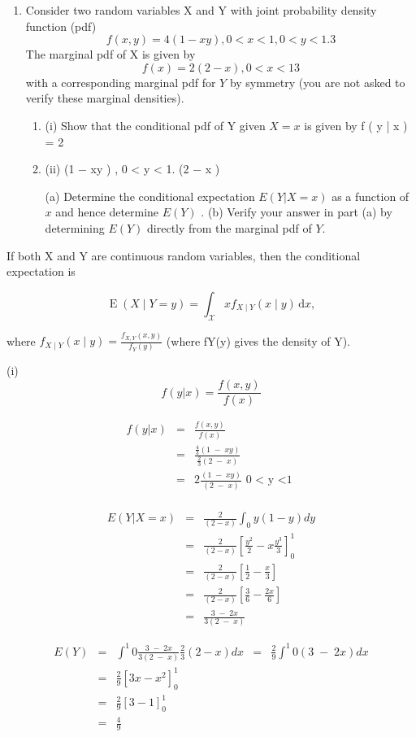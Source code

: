 \documentclass[a4paper,12pt]{article}
\begin{document}
\begin{enumerate}
\item %
Consider two random variables X and Y with joint probability density function (pdf)
\[f ( x , y ) =
4
(1 − xy ) , 0 < x < 1, 0 < y < 1 .
3\]
The marginal pdf of X is given by
\[f ( x ) =
2
(2 − x ) , 0 < x < 1
3\]
with a corresponding marginal pdf for $Y$ by symmetry (you are not asked to verify these marginal densities).
\begin{enumerate}
    \item (i)
Show that the conditional pdf of Y given $X = x$ is given by
f ( y | x ) = 2
\item (ii)
(1 − xy )
, 0 < y < 1.
(2 − x )

(a) Determine the conditional expectation $E ( Y | X = x )$ as a function of $x$ and hence determine $E ( Y )$ .
(b) Verify your answer in part (a) by determining $E ( Y )$ directly from the marginal pdf of $Y$.
\end{enumerate}
\end{enumerate}

\newpage
\begin{framed}
If both X and Y are continuous random variables, then the conditional expectation is

\[{\displaystyle \operatorname {E} (X\mid Y=y)=\int _{\mathcal {X}}xf_{X\mid Y}(x\mid y)\,\mathrm {d} x,} \]

where $ {\displaystyle f_{X\mid Y}(x\mid y)={\frac {f_{X,Y}(x,y)}{f_{Y}(y)}}}$ 
(where fY(y) gives the density of Y). 
\end{framed}
(i)
\[ f(y|x) = \frac{f(x,y)}{f(x)}\]

\begin{eqnarray*}
 f(y|x) &=& \frac{f(x,y)}{f(x)}  \\
 &=& \frac{  \frac{4}{3} (1\;-\;xy) }{\frac{2}{3} (2\;-\;x)  }  \\
 &=& 2 \frac{(1\;-\;xy)}{(2\;-\;x)} \mbox{ 0 < y <1 }  \\
 \end{eqnarray*}
 
 
 
 \begin{eqnarray*}
 E(Y|X=x) &=& \frac{2}{(2-x)} \int^{}_{0} y(1-y) dy \\
  &=& \frac{2}{(2-x)} \left[  \frac{y^2}{2} - x \frac{y^3}{3}\right]^{1}_{0} \\ 
  &=& \frac{2}{(2-x)} \left[  \frac{1}{2} -  \frac{x}{3}\right] \\ 
  &=& \frac{2}{(2-x)} \left[  \frac{3}{6} -  \frac{2x}{6}\right] \\ 
  &=& \frac{3\;-\;2x}{3(2\;-\;x)}
 \end{eqnarray*}
 
 \begin{eqnarray*}
 E(Y) &=& \int^{1}{0} \frac{3\;-\;2x}{3(2\;-\;x)} \frac{2}{3} (2-x) dx
 &=& \frac{2}{9} \int^{1}{0}  (3 \;-\;2x) dx \\
 &=&  \frac{2}{9}  \left[  3x - x^2 \right]^{1}_{0} \\
&=&  \frac{2}{9}  \left[  3- 1 \right]^{1}_{0} \\ 
&=& \frac{4}{9}
\end{eqnarray*}
\end{document}
